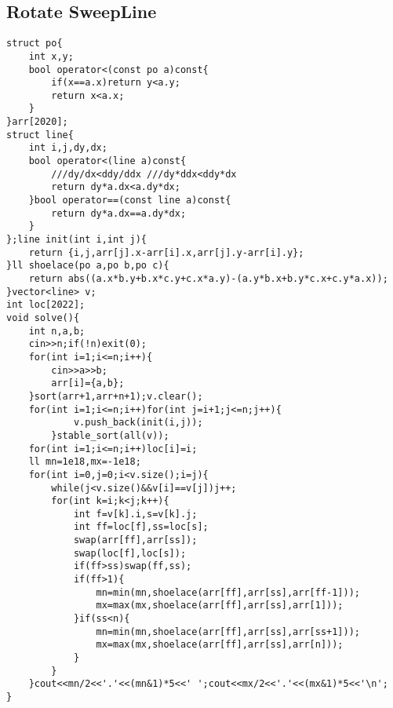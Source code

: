 \documentclass[landscape, 8pt, a4paper, oneside, twocolumn]{extarticle}
\begin{document}
\subsection{Rotate SweepLine}
\begin{verbatim}
struct po{
    int x,y;
    bool operator<(const po a)const{
        if(x==a.x)return y<a.y;
        return x<a.x;
    }
}arr[2020];
struct line{
    int i,j,dy,dx;
    bool operator<(line a)const{
        ///dy/dx<ddy/ddx ///dy*ddx<ddy*dx
        return dy*a.dx<a.dy*dx;
    }bool operator==(const line a)const{
        return dy*a.dx==a.dy*dx;
    }
};line init(int i,int j){
    return {i,j,arr[j].x-arr[i].x,arr[j].y-arr[i].y};
}ll shoelace(po a,po b,po c){
    return abs((a.x*b.y+b.x*c.y+c.x*a.y)-(a.y*b.x+b.y*c.x+c.y*a.x));
}vector<line> v;
int loc[2022];
void solve(){
    int n,a,b;
    cin>>n;if(!n)exit(0);
    for(int i=1;i<=n;i++){
        cin>>a>>b;
        arr[i]={a,b};
    }sort(arr+1,arr+n+1);v.clear();
    for(int i=1;i<=n;i++)for(int j=i+1;j<=n;j++){
            v.push_back(init(i,j));
        }stable_sort(all(v));
    for(int i=1;i<=n;i++)loc[i]=i;
    ll mn=1e18,mx=-1e18;
    for(int i=0,j=0;i<v.size();i=j){
        while(j<v.size()&&v[i]==v[j])j++;
        for(int k=i;k<j;k++){
            int f=v[k].i,s=v[k].j;
            int ff=loc[f],ss=loc[s];
            swap(arr[ff],arr[ss]);
            swap(loc[f],loc[s]);
            if(ff>ss)swap(ff,ss);
            if(ff>1){
                mn=min(mn,shoelace(arr[ff],arr[ss],arr[ff-1]));
                mx=max(mx,shoelace(arr[ff],arr[ss],arr[1]));
            }if(ss<n){
                mn=min(mn,shoelace(arr[ff],arr[ss],arr[ss+1]));
                mx=max(mx,shoelace(arr[ff],arr[ss],arr[n]));
            }
        }
    }cout<<mn/2<<'.'<<(mn&1)*5<<' ';cout<<mx/2<<'.'<<(mx&1)*5<<'\n';
}
\end{verbatim}
\end{document}
